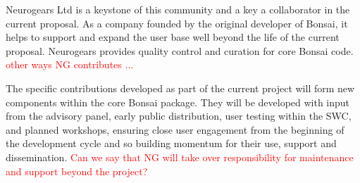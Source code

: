 Neurogears Ltd is a keystone of this community and a key a collaborator in the current proposal.  As a company founded by the original developer of Bonsai, it helps to support and expand the user base well beyond the life of the current proposal.  Neurogears provides quality control and curation for core Bonsai code.  \textcolor{red}{other ways NG contributes ...} 

The specific contributions developed as part of the current project will form new components within the core Bonsai package. 
%
They will be developed with input from the advisory panel, early public distribution, user testing within the SWC, and planned workshops, ensuring close user engagement from the beginning of the development cycle and so building momentum for their use, support and dissemination.
%
\textcolor{red}{Can we say that NG will take over responsibility for maintenance and support beyond the project?}





